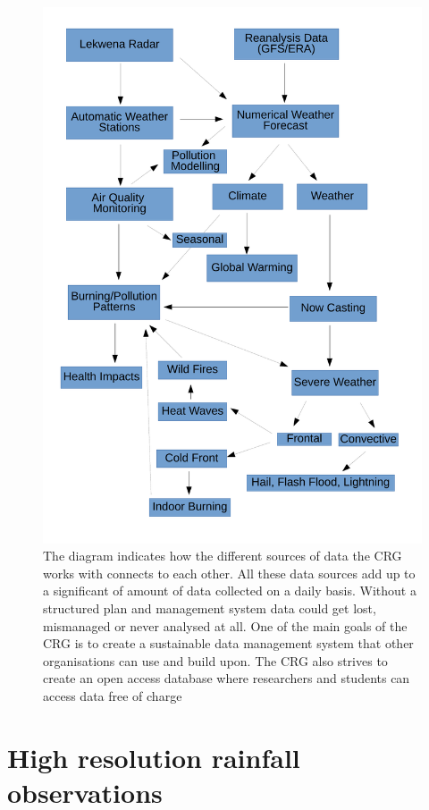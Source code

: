 \documentclass{wrcreport}
\begin{document}
\begin{figure}[htp]
\includegraphics[width=\textwidth]{intersectional.pdf}
\caption[NWU CRG Resrearch Intersections]{The diagram indicates how
the different sources of data the CRG works with connects to each
other. All these data sources add up to a significant of amount of
data collected on a daily basis. Without a structured plan and
management system data could get lost, mismanaged or never analysed at
all. One of the main goals of the CRG is to create a sustainable data
management system that other organisations can use and build upon. The
CRG also strives to create an open access database where researchers
and students can access data free of charge} \label{fig:data}
\end{figure}

\chapter{High resolution rainfall observations}
\label{chap:rainfall}
\end{document}
